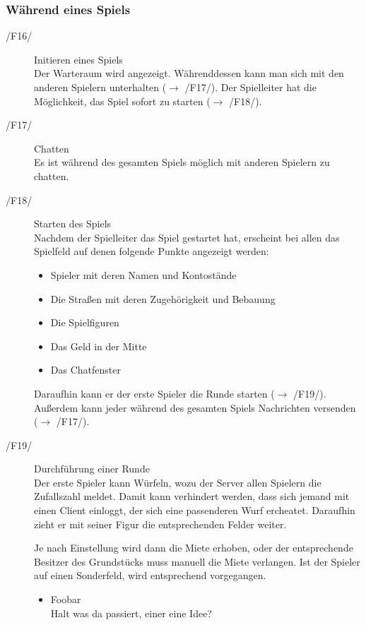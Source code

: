\documentclass[a4paper,10pt]{article}
\begin{document}
\subsubsection{Während eines Spiels}
\begin{description}
\item[/F16/] Initieren eines Spiels \\
Der Warteraum wird angezeigt. Währenddessen kann man sich mit den anderen Spielern unterhalten ($\rightarrow$ /F17/). Der Spielleiter hat die Möglichkeit, das Spiel sofort zu starten ($\rightarrow$ /F18/).
\item[/F17/] Chatten \\
Es ist während des gesamten Spiels möglich mit anderen Spielern zu chatten.
\item[/F18/] Starten des Spiels \\
Nachdem der Spielleiter das Spiel gestartet hat, erscheint bei allen das Spielfeld auf denen folgende Punkte angezeigt werden:
\begin{itemize}
\item Spieler mit deren Namen und Kontostände
\item Die Straßen mit deren Zugehörigkeit und Bebauung
\item Die Spielfiguren
\item Das Geld in der Mitte %
\item Das Chatfenster
\end{itemize}
Daraufhin kann er der erste Spieler die Runde starten ($\rightarrow$ /F19/). Außerdem kann jeder während des gesamten Spiels Nachrichten versenden ($\rightarrow$ /F17/).
\item[/F19/] Durchführung einer Runde \\
Der erste Spieler kann Würfeln, wozu der Server allen Spielern die Zufallszahl meldet. Damit kann verhindert werden, dass sich jemand mit einen Client einloggt, der sich eine passenderen Wurf ercheatet. Daraufhin zieht er mit seiner Figur die entsprechenden Felder weiter.

Je nach Einstellung wird dann die Miete erhoben, oder der entsprechende Besitzer des Grundstücks muss manuell die Miete verlangen. Ist der Spieler auf einen Sonderfeld, wird entsprechend vorgegangen.
\begin{itemize}
\item Foobar \\
Halt was da passiert, einer eine Idee?
\end{itemize}


\end{description}
\end{document}

